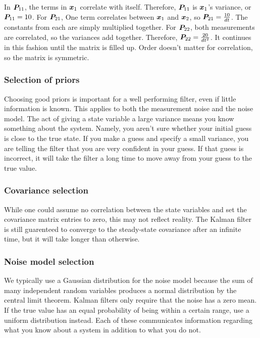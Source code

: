 In $\bm P_{11}$, the terms in $\bm x_1$ correlate with itself. Therefore,
$\bm P_{11}$ is $\bm x_1$'s variance, or $\bm P_{11} = 10$. For
$\bm P_{21}$, One term correlates between $\bm x_1$ and $\bm x_2$, so
$\bm P_{21} = \frac{10}{dt}$. The constants from each are simply multiplied
together. For $\bm P_{22}$, both measurements are correlated, so the variances
add together. Therefore, $\bm P_{22} = \frac{20}{dt^2}$. It continues in this
fashion until the matrix is filled up. Order doesn't matter for correlation, so
the matrix is symmetric.

\subsubsection{Selection of priors}

Choosing good priors is important for a well performing filter, even if little
information is known. This applies to both the measurement noise and the noise
\gls{model}. The act of giving a state variable a large variance means you know
something about the system. Namely, you aren't sure whether your initial guess
is close to the true state. If you make a guess and specify a small variance,
you are telling the filter that you are very confident in your guess. If that
guess is incorrect, it will take the filter a long time to move away from your
guess to the true value.

\subsubsection{Covariance selection}

While one could assume no correlation between the state variables and set the
covariance matrix entries to zero, this may not reflect reality. The Kalman
filter is still guarenteed to converge to the steady-state covariance after an
infinite time, but it will take longer than otherwise.

\subsubsection{Noise model selection}

We typically use a Gaussian distribution for the noise \gls{model} because the
sum of many independent random variables produces a normal distribution by the
central limit theorem. Kalman filters only require that the noise has a zero
mean. If the true value has an equal probability of being within a certain
range, use a uniform distribution instead. Each of these communicates
information regarding what you know about a system in addition to what you do
not.

